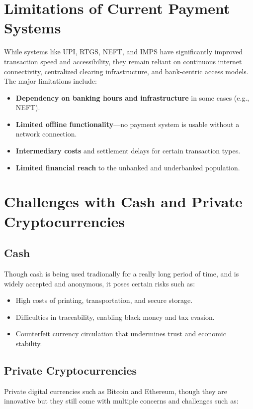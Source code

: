  
\section{Limitations of Current Payment Systems}
\label{chp3.limitations}

While systems like UPI, RTGS, NEFT, and IMPS have significantly improved transaction speed and accessibility, they remain reliant on continuous internet connectivity, centralized clearing infrastructure, and bank-centric access models. The major limitations include:

\begin{itemize}
    \item \textbf{Dependency on banking hours and infrastructure} in some cases (e.g., NEFT).
    \item \textbf{Limited offline functionality}—no payment system is usable without a network connection.
    \item \textbf{Intermediary costs} and settlement delays for certain transaction types.
    \item \textbf{Limited financial reach} to the unbanked and underbanked population.
\end{itemize}

\section{Challenges with Cash and Private Cryptocurrencies}
\label{chp3.challenges}

\subsection*{Cash}
Though cash is being used tradionally for a really long period of time, and is  widely accepted and anonymous, it poses certain risks such as:

\begin{itemize}
    \item High costs of printing, transportation, and secure storage.
    \item Difficulties in traceability, enabling black money and tax evasion.
    \item Counterfeit currency circulation that undermines trust and economic stability.
\end{itemize}

\subsection*{Private Cryptocurrencies}
Private digital currencies such as Bitcoin and Ethereum, though they are innovative but they still come with multiple concerns and challenges such as:

